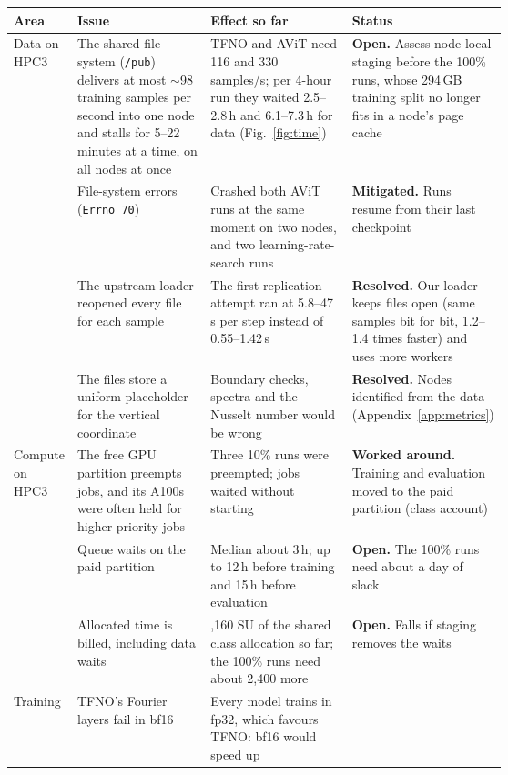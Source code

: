 \documentclass[11pt]{article}
\begin{document}
\begin{table}[!htbp]
\centering\footnotesize
\begin{tabularx}{\linewidth}{@{}>{\raggedright\arraybackslash}p{0.11\linewidth}>{\raggedright\arraybackslash}p{0.27\linewidth}>{\raggedright\arraybackslash}X>{\raggedright\arraybackslash}p{0.25\linewidth}@{}}
\toprule
Area & Issue & Effect so far & Status \\
\midrule
Data on HPC3 & The shared file system (\texttt{/pub}) delivers at most $\sim$98 training samples per second into one
node and stalls for 5--22 minutes at a time, on all nodes at once & TFNO and AViT need 116 and 330 samples/s; per
4-hour run they waited 2.5--2.8\,h and 6.1--7.3\,h for data (Fig.~\ref{fig:time}) & \textbf{Open.} Assess
node-local staging before the 100\% runs, whose 294\,GB training split no longer fits in a node's page cache \\
\addlinespace[3pt]
& File-system errors (\texttt{Errno 70}) & Crashed both AViT runs at the same moment on two nodes, and two
learning-rate-search runs & \textbf{Mitigated.} Runs resume from their last checkpoint \\ \addlinespace[3pt]
& The upstream loader reopened every file for each sample & The first replication attempt ran at 5.8--47\,s per
step instead of 0.55--1.42\,s & \textbf{Resolved.} Our loader keeps files open (same samples bit for bit, 1.2--1.4
times faster) and uses more workers \\ \addlinespace[3pt]
& The files store a uniform placeholder for the vertical coordinate & Boundary checks, spectra and the Nusselt
number would be wrong & \textbf{Resolved.} Nodes identified from the data (Appendix~\ref{app:metrics}) \\
\midrule
Compute on HPC3 & The free GPU partition preempts jobs, and its A100s were often held for higher-priority jobs &
Three 10\% runs were preempted; jobs waited without starting & \textbf{Worked around.} Training and evaluation
moved to the paid partition (class account) \\ \addlinespace[3pt]
& Queue waits on the paid partition & Median about 3\,h; up to 12\,h before training and 15\,h before evaluation &
\textbf{Open.} The 100\% runs need about a day of slack \\ \addlinespace[3pt]
& Allocated time is billed, including data waits & 2,160 SU of the shared class allocation so far; the 100\% runs
need about 2,400 more & \textbf{Open.} Falls if staging removes the waits \\
\midrule
Training & TFNO's Fourier layers fail in bf16 & Every model trains in fp32, which favours TFNO: bf16 would speed up

\end{tabularx}
\end{table}
\end{document}
